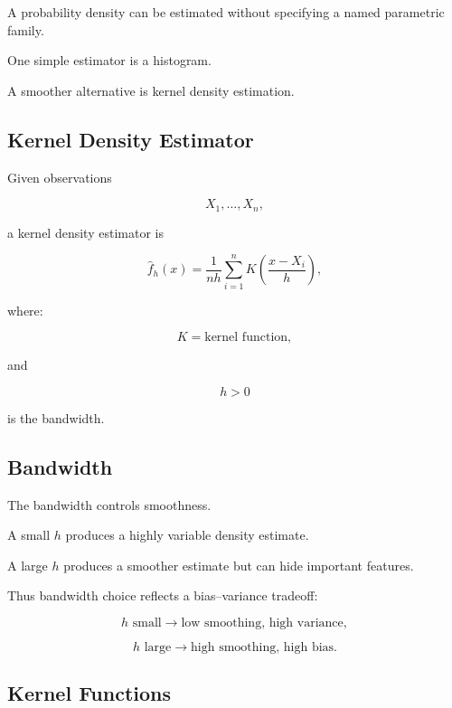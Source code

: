 A probability density can be estimated without specifying a named
parametric family.

One simple estimator is a histogram.

A smoother alternative is kernel density estimation.

\subsection{Kernel Density Estimator}
\label{subsec:kernel-density-estimator}

Given observations

\[
X_1,\ldots,X_n,
\]

a kernel density estimator is

\[
\boxed{
\widehat{f}_h(x)
=
\frac1{nh}
\sum_{i=1}^{n}
K
\left(
\frac{
x-X_i
}{h}
\right),
}
\]

where:

\[
K
=
\text{kernel function},
\]

and

\[
h>0
\]

is the bandwidth.

\subsection{Bandwidth}
\label{subsec:kde-bandwidth}

The bandwidth controls smoothness.

A small \(h\) produces a highly variable density estimate.

A large \(h\) produces a smoother estimate but can hide important
features.

Thus bandwidth choice reflects a bias--variance tradeoff:

\[
\boxed{
h\text{ small}
\rightarrow
\text{low smoothing, high variance},
}
\]

\[
\boxed{
h\text{ large}
\rightarrow
\text{high smoothing, high bias}.
}
\]

\subsection{Kernel Functions}
\label{subsec:kernel-functions}

